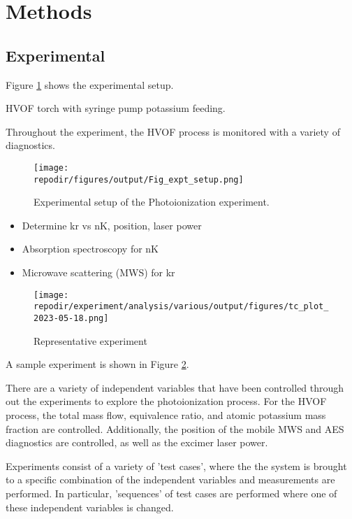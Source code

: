 \section{Methods}


\subsection{Experimental}

Figure \ref{fig:expt_setup} shows the experimental setup. 

HVOF torch with syringe pump potassium feeding. 

Throughout the experiment, the HVOF process is monitored with a variety of diagnostics. 



\begin{figure}[h]
    \texttt{[image: \\repodir/figures/output/Fig\_expt\_setup.png]} 
    \caption{Experimental setup of the Photoionization experiment. }
    \label{fig:expt_setup}
\end{figure}

\begin{itemize}
\item Determine kr vs nK, position, laser power
\item Absorption spectroscopy for nK
\item Microwave scattering (MWS) for kr 
\end{itemize}


\begin{figure}[p]
    \texttt{[image: \\repodir/experiment/analysis/various/output/figures/tc\_plot\_2023-05-18.png]} 
    \caption{Representative experiment}
    \label{fig:expt_example}
\end{figure}

A sample experiment is shown in Figure \ref{fig:expt_example}.

There are a variety of independent variables that have been controlled through out the experiments to explore the photoionization process. For the HVOF process, the total mass flow, equivalence ratio, and atomic potassium mass fraction are controlled. Additionally, the position of the mobile MWS and AES diagnostics are controlled, as well as the excimer laser power. 

Experiments consist of a variety of 'test cases', where the the system is brought to a specific combination of the independent variables and measurements are performed. In particular, 'sequences' of test cases are performed where one of these independent variables is changed. 

